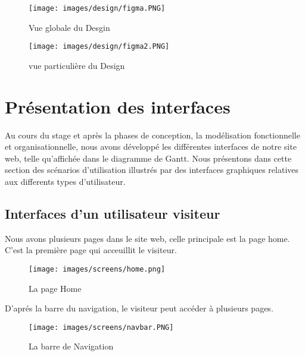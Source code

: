 \begin{figure}[!h]  
\begin{center}
\texttt{[image: images/design/figma.PNG]}
\end{center}
\caption{Vue globale du Desgin}
\end{figure}

\begin{figure}[!h]  
\begin{center}
\texttt{[image: images/design/figma2.PNG]}
\end{center}
\caption{vue particulière du Design}
\end{figure}

\newpage


\section{Présentation des interfaces}
Au cours du stage et après la phases de conception, la modélisation fonctionnelle et organisationnelle, nous avons développé les différentes interfaces de notre site web, telle qu’affichée dans le diagramme de Gantt. Nous présentons dans cette section des scénarios d’utilisation illustrés par des interfaces graphiques relatives aux differents types d'utilisateur.

\subsection{Interfaces d'un utilisateur visiteur}
Nous avons plusieurs pages dans le site web, celle principale est la page home. C'est la première page qui acceuillit le visiteur.
\begin{figure}[!h]  
\begin{center}
\texttt{[image: images/screens/home.png]}
\end{center}
\caption{La page Home}
\end{figure}
\newpage

D'aprés la barre du navigation, le visiteur peut accéder à plusieurs pages.
\begin{figure}[!h]  
\begin{center}
\texttt{[image: images/screens/navbar.PNG]}
\end{center}
\caption{La barre de Navigation}
\end{figure}

